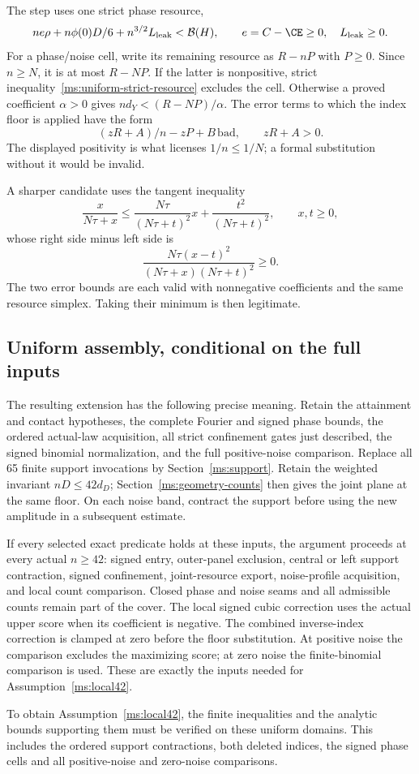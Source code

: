The step uses one strict phase resource,
\begin{equation}\label{ms:uniform-strict-resource}
 ne\rho+n\phi(0)D/6+n^{3/2}L_{\rm leak}<\mathcal B(H),
 \qquad e=C-\CE\ge0,\quad L_{\rm leak}\ge0.
\end{equation}
For a phase/noise cell, write its remaining resource as $R-nP$ with
$P\ge0$. Since $n\ge N$, it is at most $R-NP$. If the latter is
nonpositive, strict inequality~\eqref{ms:uniform-strict-resource}
excludes the cell. Otherwise a proved coefficient $\alpha>0$ gives
$nd_Y<(R-NP)/\alpha$. The error terms to which the index floor is
applied have the form
\[
 (zR+A)/n-zP+B\,\mathrm{bad},\qquad zR+A>0.
\]
The displayed positivity is what licenses $1/n\le1/N$; a formal
substitution without it would be invalid.

A sharper candidate uses the tangent inequality
\[
 \frac{x}{N\tau+x}\le
 \frac{N\tau}{(N\tau+t)^2}x+
 \frac{t^2}{(N\tau+t)^2},\qquad x,t\ge0,
\]
whose right side minus left side is
\[
 \frac{N\tau(x-t)^2}{(N\tau+x)(N\tau+t)^2}\ge0.
\]
The two error bounds are each valid with nonnegative coefficients and
the same resource simplex. Taking their minimum is then legitimate.

\subsection{Uniform assembly, conditional on the full inputs}

The resulting extension has the following precise meaning. Retain the
attainment and contact hypotheses, the complete Fourier and signed
phase bounds, the ordered actual-law acquisition, all strict confinement
gates just described, the signed binomial normalization, and the full
positive-noise comparison. Replace all 65 finite support invocations
by Section~\ref{ms:support}. Retain the weighted invariant $nD\le42d_D$;
Section~\ref{ms:geometry-counts} then gives the joint plane at the same
floor. On each noise band, contract the support before using the new
amplitude in a subsequent estimate.

If every selected exact predicate holds at these inputs, the argument
proceeds at every actual $n\ge42$: signed entry, outer-panel exclusion,
central or left support contraction, signed confinement, joint-resource
export, noise-profile acquisition, and local count comparison. Closed
phase and noise seams and all admissible counts remain part of the
cover. The local signed cubic correction uses the actual upper score
when its coefficient is negative. The combined inverse-index correction
is clamped at zero before the floor substitution. At positive noise the comparison excludes the maximizing score; at zero
noise the finite-binomial comparison is used. These are
exactly the inputs needed for Assumption~\ref{ms:local42}.

To obtain Assumption~\ref{ms:local42}, the finite inequalities and the
analytic bounds supporting them must be verified on these uniform domains.
This includes the ordered support contractions, both deleted indices,
the signed phase cells and all positive-noise and zero-noise comparisons.
